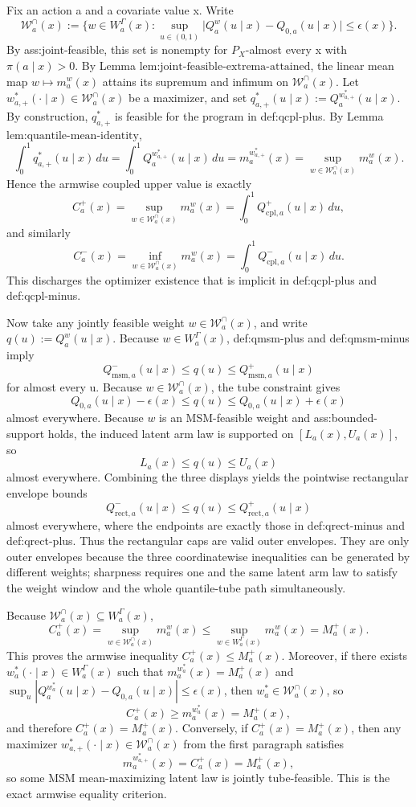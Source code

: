 \documentclass{article}
\begin{document}
Fix an action a and a covariate value x. Write
\[
\mathcal W_a^{\cap}(x):=\Big\{w\in W_a^{\Gamma}(x): \sup_{u\in(0,1)}\big|Q_a^w(u\mid x)-Q_{0,a}(u\mid x)\big|\le \epsilon(x)\Big\}.
\]
By ass:joint-feasible, this set is nonempty for \(P_X\)-almost every x with \(\pi(a\mid x)>0\). By Lemma \(\text{lem:joint-feasible-extrema-attained}\), the linear mean map \(w\mapsto m_a^w(x)\) attains its supremum and infimum on \(\mathcal W_a^{\cap}(x)\). Let \(w_{a,+}^*(\cdot\mid x)\in\mathcal W_a^{\cap}(x)\) be a maximizer, and set \(q_{a,+}^*(u\mid x):=Q_a^{w_{a,+}^*}(u\mid x)\). By construction, \(q_{a,+}^*\) is feasible for the program in def:qcpl-plus. By Lemma \(\text{lem:quantile-mean-identity}\),
\[
\int_0^1 q_{a,+}^*(u\mid x)\,du = \int_0^1 Q_a^{w_{a,+}^*}(u\mid x)\,du = m_a^{w_{a,+}^*}(x)=\sup_{w\in\mathcal W_a^{\cap}(x)} m_a^w(x).
\]
Hence the armwise coupled upper value is exactly
\[
C_a^+(x)=\sup_{w\in\mathcal W_a^{\cap}(x)} m_a^w(x)=\int_0^1 Q_{\mathrm{cpl},a}^+(u\mid x)\,du,
\]
and similarly
\[
C_a^-(x)=\inf_{w\in\mathcal W_a^{\cap}(x)} m_a^w(x)=\int_0^1 Q_{\mathrm{cpl},a}^-(u\mid x)\,du.
\]
This discharges the optimizer existence that is implicit in def:qcpl-plus and def:qcpl-minus.

Now take any jointly feasible weight \(w\in\mathcal W_a^{\cap}(x)\), and write \(q(u):=Q_a^w(u\mid x)\). Because \(w\in W_a^{\Gamma}(x)\), def:qmsm-plus and def:qmsm-minus imply
\[
Q_{\mathrm{msm},a}^-(u\mid x)\le q(u)\le Q_{\mathrm{msm},a}^+(u\mid x)
\]
for almost every u. Because \(w\in\mathcal W_a^{\cap}(x)\), the tube constraint gives
\[
Q_{0,a}(u\mid x)-\epsilon(x)\le q(u)\le Q_{0,a}(u\mid x)+\epsilon(x)
\]
almost everywhere. Because \(w\) is an MSM-feasible weight and ass:bounded-support holds, the induced latent arm law is supported on \([L_a(x),U_a(x)]\), so
\[
L_a(x)\le q(u)\le U_a(x)
\]
almost everywhere. Combining the three displays yields the pointwise rectangular envelope bounds
\[
Q_{\mathrm{rect},a}^-(u\mid x)\le q(u)\le Q_{\mathrm{rect},a}^+(u\mid x)
\]
almost everywhere, where the endpoints are exactly those in def:qrect-minus and def:qrect-plus. Thus the rectangular caps are valid outer envelopes. They are only outer envelopes because the three coordinatewise inequalities can be generated by different weights; sharpness requires one and the same latent arm law to satisfy the weight window and the whole quantile-tube path simultaneously.

Because \(\mathcal W_a^{\cap}(x)\subseteq W_a^{\Gamma}(x)\),
\[
C_a^+(x)=\sup_{w\in\mathcal W_a^{\cap}(x)} m_a^w(x)\le \sup_{w\in W_a^{\Gamma}(x)} m_a^w(x)=M_a^+(x).
\]
This proves the armwise inequality \(C_a^+(x)\le M_a^+(x)\). Moreover, if there exists \(w_a^*(\cdot\mid x)\in W_a^{\Gamma}(x)\) such that \(m_a^{w_a^*}(x)=M_a^+(x)\) and \(\sup_u |Q_a^{w_a^*}(u\mid x)-Q_{0,a}(u\mid x)|\le \epsilon(x)\), then \(w_a^*\in\mathcal W_a^{\cap}(x)\), so
\[
C_a^+(x)\ge m_a^{w_a^*}(x)=M_a^+(x),
\]
and therefore \(C_a^+(x)=M_a^+(x)\). Conversely, if \(C_a^+(x)=M_a^+(x)\), then any maximizer \(w_{a,+}^*(\cdot\mid x)\in\mathcal W_a^{\cap}(x)\) from the first paragraph satisfies
\[
m_a^{w_{a,+}^*}(x)=C_a^+(x)=M_a^+(x),
\]
so some MSM mean-maximizing latent law is jointly tube-feasible. This is the exact armwise equality criterion.
\end{document}
